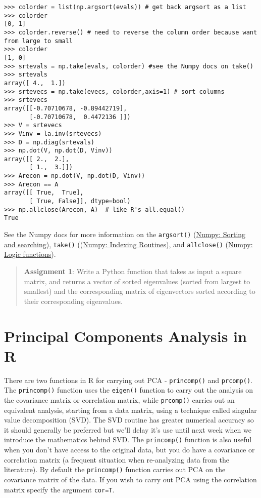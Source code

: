 \documentclass{article}
\begin{document}
\begin{lstlisting}
>>> colorder = list(np.argsort(evals)) # get back argsort as a list
>>> colorder
[0, 1]
>>> colorder.reverse() # need to reverse the column order because want from large to small
>>> colorder
[1, 0]
>>> srtevals = np.take(evals, colorder) #see the Numpy docs on take()
>>> srtevals
array([ 4.,  1.])
>>> srtevecs = np.take(evecs, colorder,axis=1) # sort columns
>>> srtevecs
array([[-0.70710678, -0.89442719],
       [-0.70710678,  0.4472136 ]])
>>> V = srtevecs
>>> Vinv = la.inv(srtevecs)
>>> D = np.diag(srtevals)
>>> np.dot(V, np.dot(D, Vinv))
array([[ 2.,  2.],
       [ 1.,  3.]])
>>> Arecon = np.dot(V, np.dot(D, Vinv))
>>> Arecon == A
array([[ True,  True],
       [ True, False]], dtype=bool)
>>> np.allclose(Arecon, A)  # like R's all.equal()
True     
\end{lstlisting}
See the Numpy docs for more information on the \lstinline!argsort()!
(\href{http://docs.scipy.org/doc/numpy/reference/routines.sort.html}{Numpy:
Sorting and searching}), \lstinline!take()!
((\href{http://docs.scipy.org/doc/numpy/reference/routines.indexing.html}{Numpy:
Indexing Routines}), and \lstinline!allclose()!
(\href{http://docs.scipy.org/doc/numpy/reference/routines.logic.html}{Numpy:
Logic functions}).

\begin{quote}
\textbf{Assignment 1}: Write a Python function that takes as input a
square matrix, and returns a vector of sorted eigenvalues (sorted from
largest to smallest) and the corresponding matrix of eigenvectors sorted
according to their corresponding eigenvalues.

\end{quote}
\section{Principal Components Analysis in R}

There are two functions in R for carrying out PCA -
\lstinline!princomp()! and \lstinline!prcomp()!. The
\lstinline!princomp()! function uses the \lstinline!eigen()! function to
carry out the analysis on the covariance matrix or correlation matrix,
while \lstinline!prcomp()! carries out an equivalent analysis, starting
from a data matrix, using a technique called singular value
decomposition (SVD). The SVD routine has greater numerical accuracy so
it should generally be preferred but we'll delay it's use until next
week when we introduce the mathematics behind SVD. The
\lstinline!princomp()! function is also useful when you don't have
access to the original data, but you do have a covariance or correlation
matrix (a frequent situation when re-analyzing data from the
literature). By default the \lstinline!princomp()! function carries out
PCA on the covariance matrix of the data. If you wish to carry out PCA
using the correlation matrix specify the argument \lstinline!cor=T!.
\end{document}
